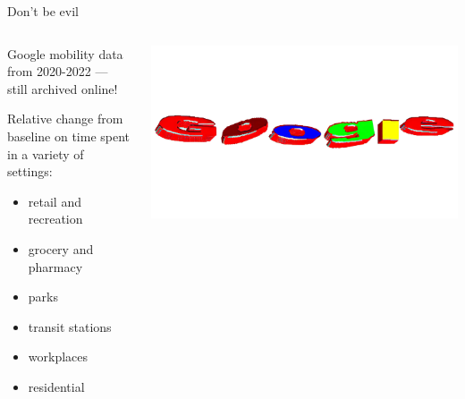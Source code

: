 \documentclass[
  ignorenonframetext,
  aspectratio=149,
]{beamer}
\providecommand{\tightlist}{%
  \setlength{\itemsep}{0pt}\setlength{\parskip}{0pt}}\usepackage{longtable,booktabs,array}
\begin{document}
\begin{frame}{Don't be evil}
\label{dont-be-evil}
\begin{columns}[T]
\begin{column}{0.6\textwidth}
Google mobility data from 2020-2022 --- still archived online!\newline

Relative change from baseline on time spent in a variety of
settings:\newline

\begin{itemize}
\tightlist
\item
  retail and recreation
\item
  grocery and pharmacy
\item
  parks
\item
  transit stations
\item
  workplaces
\item
  residential
\end{itemize}
\end{column}

\begin{column}{0.4\textwidth}
\includegraphics{images/google.jpg}
\end{column}
\end{columns}
\end{frame}
\end{document}
